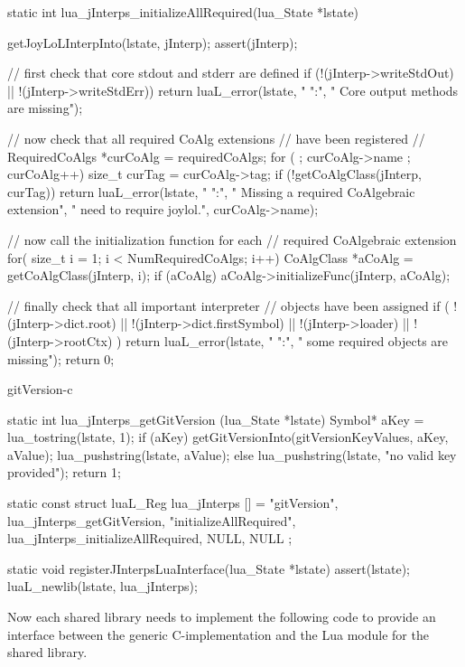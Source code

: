 \startCCode
static int lua_jInterps_initializeAllRequired(lua_State *lstate) {
  getJoyLoLInterpInto(lstate, jInterp);
  assert(jInterp);
  
  // first check that core stdout and stderr are defined
  if (!(jInterp->writeStdOut) || !(jInterp->writeStdErr)) {
    return luaL_error(lstate, "%
      "\nERROR:\n",
      "  Core output methods are missing\n");
  }
  
  // now check that all required CoAlg extensions 
  // have been registered
  //
  RequiredCoAlgs *curCoAlg = requiredCoAlgs;
  for ( ; curCoAlg->name ; curCoAlg++) {
    size_t curTag = curCoAlg->tag;
    if (!getCoAlgClass(jInterp, curTag)) {
      return luaL_error(lstate, "%
        "\nERROR:\n",
       "  Missing a required CoAlgebraic extension\n",
       "  need to require joylol.",
       curCoAlg->name);
    }
  }

  // now call the initialization function for each 
  // required CoAlgebraic extension
  for( size_t i = 1; i < NumRequiredCoAlgs; i++) {
    CoAlgClass *aCoAlg = getCoAlgClass(jInterp, i);
    if (aCoAlg) {
      aCoAlg->initializeFunc(jInterp, aCoAlg);
    }
  }
  
  // finally check that all important interpreter 
  // objects have been assigned
  if (
    !(jInterp->dict.root) || 
    !(jInterp->dict.firstSymbol) ||
    !(jInterp->loader) ||
    !(jInterp->rootCtx)
    ) {
      return luaL_error(lstate, "%
        "\nERROR:\n",
        "  some required objects are missing\n\n");
    }
  return 0;
}
\stopCCode

\component gitVersion-c

\startCCode
static int lua_jInterps_getGitVersion (lua_State *lstate) {
  Symbol* aKey   = lua_tostring(lstate, 1);
  if (aKey) {
    getGitVersionInto(gitVersionKeyValues, aKey, aValue);
    lua_pushstring(lstate, aValue);
  } else {
    lua_pushstring(lstate, "no valid key provided");
  }
  return 1;
}
\stopCCode

\startCCode
static const struct luaL_Reg lua_jInterps [] = {
  {"gitVersion",            lua_jInterps_getGitVersion},
  {"initializeAllRequired", lua_jInterps_initializeAllRequired},
  {NULL, NULL}
};
\stopCCode

\startCCode
static void registerJInterpsLuaInterface(lua_State *lstate) {
  assert(lstate);
  luaL_newlib(lstate, lua_jInterps);
}
\stopCCode

Now each shared library needs to implement the following code to provide 
an interface between the generic C-implementation and the Lua module for 
the shared library. 

